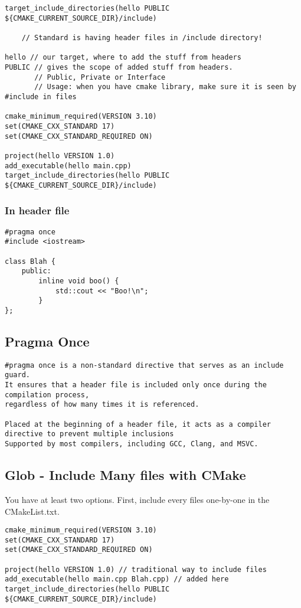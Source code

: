 \begin{verbatim}
target_include_directories(hello PUBLIC ${CMAKE_CURRENT_SOURCE_DIR}/include)

    // Standard is having header files in /include directory!

hello // our target, where to add the stuff from headers
PUBLIC // gives the scope of added stuff from headers. 
       // Public, Private or Interface
       // Usage: when you have cmake library, make sure it is seen by #include in files

cmake_minimum_required(VERSION 3.10)
set(CMAKE_CXX_STANDARD 17)
set(CMAKE_CXX_STANDARD_REQUIRED ON)

project(hello VERSION 1.0)
add_executable(hello main.cpp)
target_include_directories(hello PUBLIC ${CMAKE_CURRENT_SOURCE_DIR}/include)
\end{verbatim}

\subsubsection{In header file}

\begin{verbatim}
#pragma once
#include <iostream>

class Blah {
    public:
        inline void boo() {
            std::cout << "Boo!\n";
        }
};
\end{verbatim}

\subsection{Pragma Once}

\begin{verbatim}
#pragma once is a non-standard directive that serves as an include guard. 
It ensures that a header file is included only once during the compilation process,
regardless of how many times it is referenced.

Placed at the beginning of a header file, it acts as a compiler directive to prevent multiple inclusions
Supported by most compilers, including GCC, Clang, and MSVC.
\end{verbatim}

\subsection{Glob - Include Many files with CMake}
 
You have at least two options. First, include every files one-by-one in the CMakeList.txt.
\begin{verbatim}
cmake_minimum_required(VERSION 3.10)
set(CMAKE_CXX_STANDARD 17)
set(CMAKE_CXX_STANDARD_REQUIRED ON)

project(hello VERSION 1.0) // traditional way to include files
add_executable(hello main.cpp Blah.cpp) // added here
target_include_directories(hello PUBLIC ${CMAKE_CURRENT_SOURCE_DIR}/include)
\end{verbatim}

